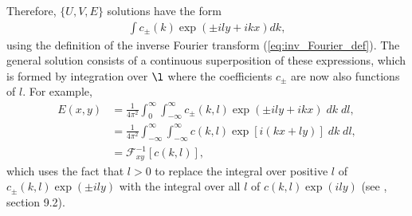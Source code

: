 \documentclass[10pt,reqno]{amsart}
\begin{document}
Therefore,  $\{ U, V, E \}$ solutions have the form
\begin{align}
\int c_\pm (k) \exp \left( \pm i l y + i k x  \right)  dk,
\end{align}
using the definition of the inverse Fourier transform (\ref{eq:inv_Fourier_def}).
The general solution consists of a continuous superposition of these expressions, which is formed by integration over $\l$ where the coefficients $c_\pm$ are now also functions of $l$.
For example, 
\begin{align}
E (x, y) & = \frac{1}{4 \pi^2} \int _0 ^{\infty} \int_{-\infty}^{\infty} c_\pm (k,l) \exp \left( \pm i l y + i k x  \right) \; dk \; dl ,   \\
& = \frac{1}{4 \pi^2} \int _{-\infty} ^{\infty} \int_{-\infty}^{\infty} c (k,l) \exp  \left[ i \left( k x + l y \right) \right] \; dk \; dl ,   \\
& = {\mathcal F}^{-1}_{xy} \left[ c (k , l) \right] ,  
\end{align}
which uses the fact that $l > 0$ to replace the integral over positive $l$ of $c_{\pm} (k,l) \exp(\pm i l y ) $ with the integral over all $l$ of $c (k,l) \exp (i l y) $ (see \citealt{haberman87}, section 9.2).
\end{document}
